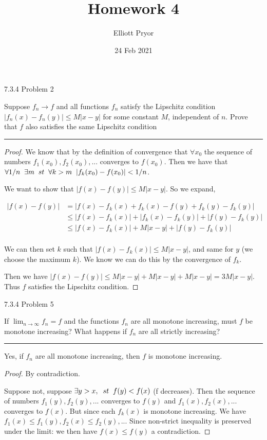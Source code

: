 \documentclass[11pt]{article}
\title{Homework 4}
\author{Elliott Pryor}
\date{24 Feb 2021}
\begin{document}
\maketitle

 7.3.4 Problem 2

Suppose $f_n \to f$ and all functions $f_n$ satisfy the Lipschitz condition
$|f_n(x) - f_n(y)| \leq M |x-y|$ for some constant $M$, independent of $n$.
Prove that $f$ also satisfies the same Lipschitz condition

\hrule


\begin{proof}
    We know that by the definition of convergence that $\forall x_0$ the sequence of numbers
    $f_1(x_0), f_2(x_0), ...$ converges to $f(x_0)$. Then we have that 
    $\forall 1/n \sp \exists m \sp st \sp \forall k > m \sp |f_k(x_0) - f(x_0) | < 1/n$.

    We want to show that $|f(x) - f(y)| \leq M |x-y|$. So we expand,

    \begin{align*}
        |f(x) - f(y)| &= |f(x) - f_k(x) + f_k(x) - f(y) + f_k(y) - f_k(y)| \\
        &\leq |f(x) - f_k(x)|  + |f_k(x) - f_k(y)| + |f(y) - f_k(y)|\\
        &\leq |f(x) - f_k(x)|  + M|x - y| + |f(y) - f_k(y)|\\
    \end{align*}

    We can then set $k$ such that $|f(x) - f_k(x)| \leq M |x - y|$, and same for $y$ (we choose the maximum $k$).
    We know we can do this by the convergence of $f_k$. 

    Then we have $|f(x) - f(y)| \leq  M|x - y| +  M|x - y| +  M|x - y| = 3 M|x - y|$.
    Thus $f$ satisfies the Lipschitz condition.
\end{proof}







 7.3.4 Problem 5

If $\lim_{n \to \infty} f_n = f$ and the functions $f_n$ are all monotone increasing, must $f$ be monotone increasing?
What happens if $f_n$ are all strictly increasing?

\hrule

Yes, if $f_n$ are all monotone increasing, then $f$ is monotone increasing.

\begin{proof}
    By contradiction.

    Suppose not, suppose $\exists y > x, \sp st \sp f(y) < f(x)$ (f decreases).
    Then the sequence of numbers $f_1(y), f_2(y), ...$ converges to $f(y)$
    and $f_1(x), f_2(x), ...$ converges to $f(x)$. But since each $f_k(x)$ is monotone increasing.
    We have $f_1(x) \leq f_1(y), f_2(x) \leq f_2(y), ...$
    Since non-strict inequality is preserved under the limit: we then have $f(x) \leq f(y)$
    a contradiction.
\end{proof}
\end{document}
